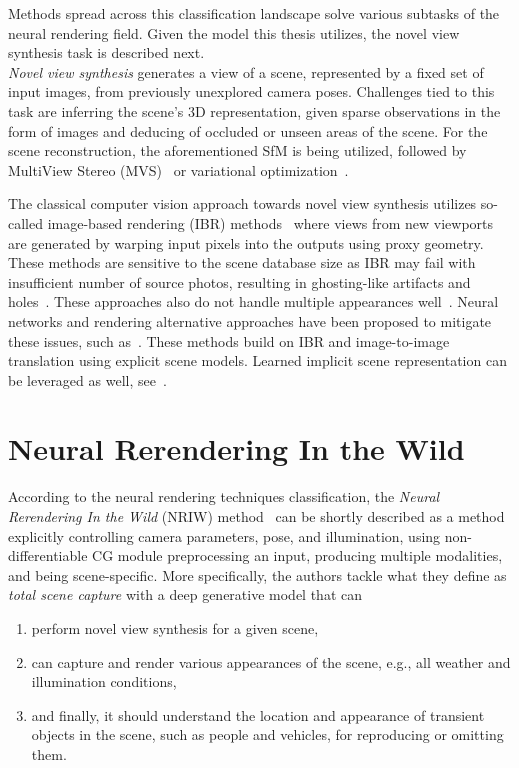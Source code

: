 Methods spread across this classification landscape solve various subtasks of the neural rendering field.
Given the model this thesis utilizes, the novel view synthesis task is described next.\\

\emph{Novel view synthesis} generates a view of a
scene, represented by a fixed set of input images, from previously unexplored camera poses. Challenges tied to this task are inferring the scene's 3D
representation, given sparse observations in the form of images and deducing of occluded
or unseen areas of the scene. For the scene reconstruction, the aforementioned SfM is being utilized, followed by
MultiView Stereo (MVS)~\cite{MVS1, MVS2} or variational optimization~\cite{VarOpt}.

The classical computer vision approach towards novel view synthesis utilizes so-called image-based rendering (IBR)
methods~\citep{IBR1, IBR2, IBR3, IBR4} where views from new viewports are generated by warping input pixels into the
outputs using proxy geometry. These methods are sensitive to the scene database size as IBR may fail with insufficient number of source photos, resulting in ghosting-like artifacts and holes~\citep{SOTARendering}. These approaches
also do not handle multiple appearances well~\citep{NRIW}. Neural networks and
rendering alternative approaches have been proposed to mitigate these issues, such as~\citet{NR1, NR2, NRIW, InvSfM, FVS, SVS}.
These methods build on IBR and image-to-image translation using explicit scene models. Learned implicit
scene representation can be leveraged as well, see~\citet{NERF, NERF2, SceneRepr}.


\section{Neural Rerendering In the Wild}

According to the neural rendering techniques classification, the \emph{Neural Rerendering In the Wild} (NRIW) method~\citep{NRIW}
can be shortly described as a method explicitly controlling camera parameters, pose, and illumination, using
non-differentiable CG module preprocessing an input, producing multiple modalities, and being scene-specific.
More specifically, the authors tackle what they define as \emph{total scene capture} with a deep generative model that can
\begin{enumerate}
    \item perform novel view synthesis for a given scene,
    \item can capture and render various appearances of the scene, e.g., all
    weather and illumination conditions,
    \item and finally, it should understand the location and appearance of transient objects
    in the scene, such as people and vehicles, for reproducing or omitting them.
\end{enumerate}

